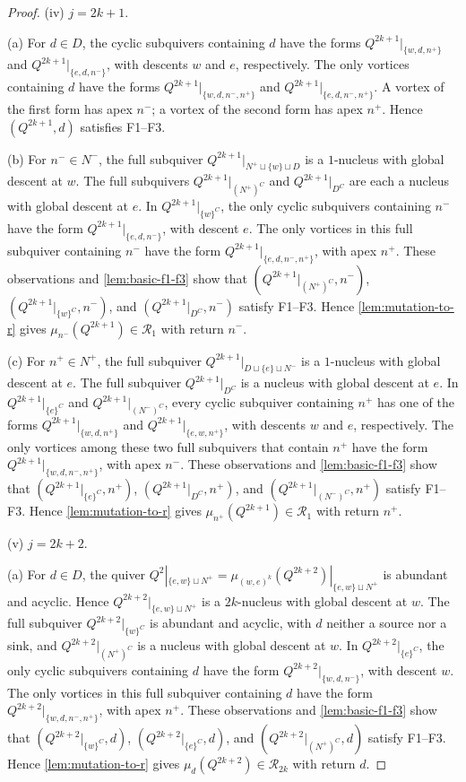 \documentclass[10pt,a4paper]{amsart}
\theoremstyle{definition}
\theoremstyle{definition}
\numberwithin{equation}{section}
\numberwithin{table}{section}
\newcommand{\nminus}{N^{-}}
\newcommand{\nplus}{N^{+}}
\newcommand{\Rclass}{\mathcal{R}}
\newcommand{\Qalt}[1]{Q^{#1}}
\begin{document}
\begin{proof}
\textup{(iv)} $j=2k+1$.

\textup{(a)} For $d\in D$, the cyclic subquivers containing $d$
have the forms $\Qalt{2k+1}|_{\{w,d,n^+\}}$ and
$\Qalt{2k+1}|_{\{e,d,n^-\}}$, with descents $w$ and $e$, respectively. The
only vortices containing $d$ have the forms
$\Qalt{2k+1}|_{\{w,d,n^-,n^+\}}$ and
$\Qalt{2k+1}|_{\{e,d,n^-,n^+\}}$. A vortex of the first form has apex
$n^-$; a vortex of the second form has apex $n^+$. Hence
$(\Qalt{2k+1},d)$ satisfies F1--F3.

\textup{(b)} For $n^-\in\nminus$, the full subquiver
$\Qalt{2k+1}|_{\nplus\sqcup\{w\}\sqcup D}$ is a $1$-nucleus with global
descent at $w$. The full subquivers
$\Qalt{2k+1}|_{(\nplus)^C}$ and $\Qalt{2k+1}|_{D^C}$ are each a nucleus with
global descent at $e$. In $\Qalt{2k+1}|_{\{w\}^C}$, the only cyclic subquivers
containing $n^-$ have the form $\Qalt{2k+1}|_{\{e,d,n^-\}}$, with descent
$e$. The only vortices in this full subquiver containing $n^-$ have the form
$\Qalt{2k+1}|_{\{e,d,n^-,n^+\}}$, with apex $n^+$. These observations and \cref{lem:basic-f1-f3} show that
$(\Qalt{2k+1}|_{(\nplus)^C},n^-)$,
$(\Qalt{2k+1}|_{\{w\}^C},n^-)$, and
$(\Qalt{2k+1}|_{D^C},n^-)$ satisfy F1--F3. Hence
\cref{lem:mutation-to-r} gives
$\mu_{n^-}(\Qalt{2k+1})\in\Rclass_1$ with return $n^-$.

\textup{(c)} For $n^+\in\nplus$, the full subquiver
$\Qalt{2k+1}|_{D\sqcup\{e\}\sqcup\nminus}$ is a $1$-nucleus with global
descent at $e$. The full subquiver $\Qalt{2k+1}|_{D^C}$ is a nucleus with
global descent at $e$. In
$\Qalt{2k+1}|_{\{e\}^C}$ and $\Qalt{2k+1}|_{(\nminus)^C}$, every cyclic
subquiver containing $n^+$ has one of the forms
$\Qalt{2k+1}|_{\{w,d,n^+\}}$ and $\Qalt{2k+1}|_{\{e,w,n^+\}}$, with
descents $w$ and $e$, respectively.
The only vortices among these two full subquivers that contain $n^+$ have
the form $\Qalt{2k+1}|_{\{w,d,n^-,n^+\}}$, with apex $n^-$. These observations and \cref{lem:basic-f1-f3} show that
$(\Qalt{2k+1}|_{\{e\}^C},n^+)$, $(\Qalt{2k+1}|_{D^C},n^+)$, and
$(\Qalt{2k+1}|_{(\nminus)^C},n^+)$ satisfy F1--F3. Hence
\cref{lem:mutation-to-r} gives
$\mu_{n^+}(\Qalt{2k+1})\in\Rclass_1$ with return $n^+$.

\textup{(v)} $j=2k+2$.

\textup{(a)} For $d\in D$, the quiver
$\Qalt{2}|_{\{e,w\}\sqcup\nplus}
=\mu_{(w,e)^k}(\Qalt{2k+2})|_{\{e,w\}\sqcup\nplus}$
is abundant and acyclic. Hence
$\Qalt{2k+2}|_{\{e,w\}\sqcup\nplus}$ is a $2k$-nucleus with global descent
at $w$. The full subquiver
$\Qalt{2k+2}|_{\{w\}^C}$ is abundant and acyclic, with $d$ neither a source
nor a sink, and $\Qalt{2k+2}|_{(\nplus)^C}$ is a nucleus with global descent
at $w$. In $\Qalt{2k+2}|_{\{e\}^C}$, the only cyclic subquivers containing
$d$ have the form $\Qalt{2k+2}|_{\{w,d,n^-\}}$, with descent $w$. The only
vortices in this full subquiver containing $d$ have the form
$\Qalt{2k+2}|_{\{w,d,n^-,n^+\}}$, with apex $n^+$. These observations and \cref{lem:basic-f1-f3} show that
$(\Qalt{2k+2}|_{\{w\}^C},d)$, $(\Qalt{2k+2}|_{\{e\}^C},d)$, and
$(\Qalt{2k+2}|_{(\nplus)^C},d)$ satisfy F1--F3. Hence
\cref{lem:mutation-to-r} gives
$\mu_d(\Qalt{2k+2})\in\Rclass_{2k}$ with return $d$.


\end{proof}
\end{document}
